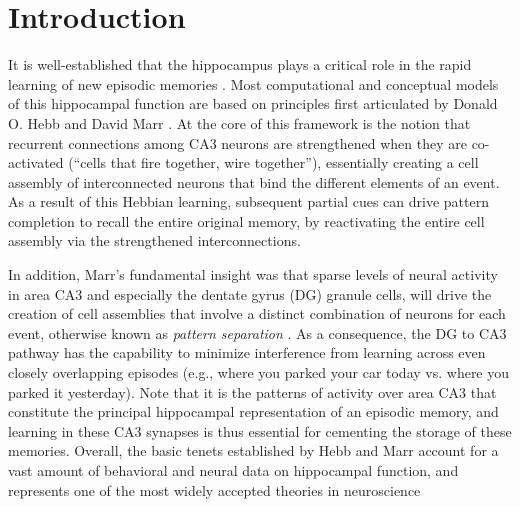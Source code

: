\documentclass[11pt,twoside]{article}
\newif\myifpdf
\begin{document}


\titlesamepageoc{\mytitle}{\myauthor}{\mynote}{\myabstract}



\pagestyle{myheadings}

\section{Introduction}

It is well-established that the hippocampus plays a critical role in the rapid learning of new episodic memories \citep{EichenbaumYonelinasRanganath07}.  Most computational and conceptual models of this hippocampal function are based on principles first articulated by Donald O. Hebb and David Marr \citep{Hebb49,Marr71,McNaughtonNadel90,McClellandMcNaughtonOReilly95}.  At the core of this framework is the notion that recurrent connections among CA3 neurons are strengthened when they are co-activated (``cells that fire together, wire together''), essentially creating a cell assembly of interconnected neurons that bind the different elements of an event.  As a result of this Hebbian learning, subsequent partial cues can drive pattern completion to recall the entire original memory, by reactivating the entire cell assembly via the strengthened interconnections.

In addition, Marr's fundamental insight was that sparse levels of neural activity in area CA3 and especially the dentate gyrus (DG) granule cells, will drive the creation of cell assemblies that involve a distinct combination of neurons for each event, otherwise known as \emph{pattern separation} \citep{Marr71,OReillyMcClelland94,YassaStark11}.  As a consequence, the DG to CA3 pathway has the capability to minimize interference from learning across even closely overlapping episodes (e.g., where you parked your car today vs. where you parked it yesterday).  Note that it is the patterns of activity over area CA3 that constitute the principal hippocampal representation of an episodic memory, and learning in these CA3 synapses is thus essential for cementing the storage of these memories.  Overall, the basic tenets established by Hebb and Marr account for a vast amount of behavioral and neural data on hippocampal function, and represents one of the most widely accepted theories in neuroscience \citep{MilnerSquireKandel98,OReillyBhattacharyyaHowardEtAl14,Eichenbaum16,YonelinasRanganathEkstromEtAl19}
 
\end{document}
